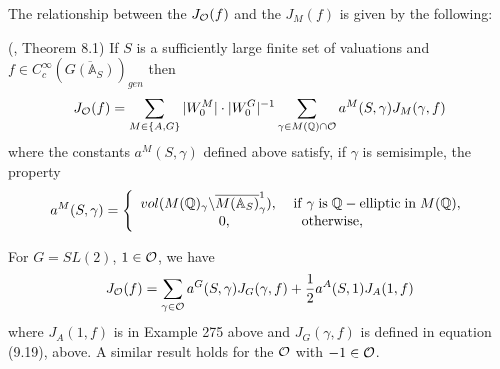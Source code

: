 The relationship between the $J_{{\cal O}}(f)$ and the
$J_M(f)$ is given by the following:

\begin{proposition}
(\cite{A12}, Theorem 8.1) If $S$ is a sufficiently large finite set of
valuations and
$f\in C_c^\infty (\overline{G({\mathbb {A}}_S)})_{gen}$ then 
\[
J_{{\cal O}}(f)=\sum_{M\in \{A,G\}}
|W_0^M|\cdot |W_0^G|^{-1}
\sum_{\gamma \in M({\mathbb {Q}})\cap {\cal{O}}}
a^M(S,\gamma )J_M(\gamma ,f) 
\]
where the constants $a^M(S,\gamma )$ defined above
satisfy, if $\gamma $ is semisimple, the property 
\[
a^M(S,\gamma )=\left\{ 
\begin{array}{c}
vol(M({\mathbb {Q}})_\gamma \backslash \overline{M({\mathbb {A}}_S)}_\gamma ^1),
\;\;\;\;{\rm if\;}\gamma \;{\rm is}\;
{\mathbb {Q}}-{\rm elliptic\;in}\;M({\mathbb {Q}}), \\ 
0,\;\;\;\;\;\;\;\;\;\;\;\;\;\;\;\;\;\;{\rm otherwise},\;\;\;\;\;
\end{array}
\right. 
\]
\end{proposition}

\begin{example} For $G=SL(2)$, $1\in {\cal O}$, we have
\[
J_{\cal O}(f)=\sum_{\gamma\in {\cal{O}}}
a^G(S,\gamma)J_G(\gamma,f)
+{1\over 2}a^A(S,1)J_A(1,f)
\]
where $J_A(1,f)$ is in Example 275 above and $J_G(\gamma,f)$
is defined in equation (9.19), above.
A similar result holds for the ${\cal{O}}$ with $-1\in {\cal{O}}$.
\end{example}


